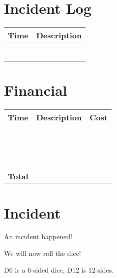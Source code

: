 \documentclass[a4paper,11pt,notitlepage,landscape]{report}
\begin{document}
\eject

\section*{Incident Log }


\begin{tabularx}{\textwidth-1cm}{|p{3cm}|X|} \hline
Time & Description \\\hline
& \\\hline
& \\\hline
& \\\hline
& \\\hline
& \\\hline
& \\\hline
\end{tabularx}


\section*{Financial }

\begin{tabularx}{\textwidth-1cm}{|p{3cm}|X|p{3cm}|} \hline
Time & Description & Cost \\\hline
& & \\\hline
& & \\\hline
& & \\\hline
& & \\\hline
& & \\\hline
& & \\\hline
& & \\\hline
& & \\\hline
& & \\\hline
& & \\\hline
& & \\\hline
& & \\\hline
& & \\\hline
& & \\\hline
& & \\\hline
{\bf Total} & & \\\hline
\end{tabularx}

\eject

\section*{Incident }

An incident happened!

We will now roll the dice!

D6 is a 6-sided dice, D12 is 12-sides.
\end{document}

